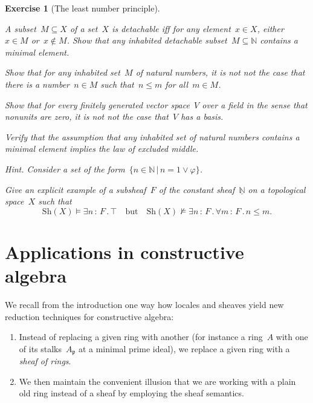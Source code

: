 \documentclass{ws-rv9x6}
\newtheorem{ex}{Exercise}
\newenvironment{exercise}[1]{
  \begin{ex}[#1]
}{\end{ex}}
\newcommand{\NN}{\mathbb{N}}
\newcommand{\ppp}{\mathfrak{p}}
\newcommand{\Sh}{\mathrm{Sh}}
\renewcommand{\_}{\mathpunct{.}}
\newcommand{\?}{\,{:}\,}
\newcommand{\notnot}{\emph{not not}\xspace}
\begin{document}
\begin{exercise}{The least number principle}%
\begin{alphlist}[(e)]
\item A subset~$M \subseteq X$ of a set~$X$ is \emph{detachable} iff for any
element~$x \in X$, either~$x \in M$ or~$x \not\in M$. Show that any inhabited
detachable subset~$M \subseteq \NN$ contains a minimal element.
\item Show that for any inhabited set~$M$ of natural numbers, it is \notnot the
case that there is a number~$n \in M$ such that~$n \leq m$ for all~$m \in M$.
\item Show that for every finitely generated vector space~$V$ over a field in the
sense that nonunits are zero, it is \notnot the case that~$V$ has a basis.
\item Verify that the assumption that any inhabited set of natural numbers
contains a minimal element implies the law of excluded middle.\smallskip

{\scriptsize\emph{Hint.} Consider a set of the form~$\{ n \in \NN \,|\, n = 1
\vee \varphi \}$.\par}
\item Give an explicit example of a subsheaf~$F$ of the constant
sheaf~$\underline{\NN}$ on a topological space~$X$ such that
\[ \Sh(X) \models \exists n\?F\_ \top
  \quad\text{but}\quad
  \Sh(X) \not\models \exists n\?F\_ \forall m\?F\_ n \leq m. \]
\end{alphlist}
\end{exercise}



\section{Applications in constructive algebra}
\label{sect:appl}

We recall from the introduction one way how locales and sheaves yield new
reduction techniques for constructive algebra:
\begin{enumerate}
\item Instead of replacing a given ring with another (for instance a ring~$A$ with
one of its stalks~$A_\ppp$ at a minimal prime ideal), we replace a given ring
with a \emph{sheaf of rings}.
\item We then maintain the convenient illusion that we are working with a plain old ring
instead of a sheaf by employing the sheaf semantics.
\end{enumerate}
\end{document}
